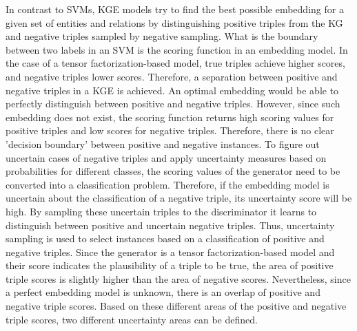 In contrast to \acp{SVM}, \ac{KGE} models try to find the best possible embedding for a given set of entities and relations by distinguishing positive triples from the \ac{KG} and negative triples sampled by negative sampling.
What is the boundary between two labels in an \ac{SVM} is the scoring function in an embedding model.
In the case of a tensor factorization-based model, true triples achieve higher scores, and negative triples lower scores.
Therefore, a separation between positive and negative triples in a \ac{KGE} is achieved.
An optimal embedding would be able to perfectly distinguish between positive and negative triples.
However, since such embedding does not exist, the scoring function returns high scoring values for positive triples and low scores for negative triples.
Therefore, there is no clear 'decision boundary' between positive and negative instances.
To figure out uncertain cases of negative triples and apply uncertainty measures based on probabilities for different classes, the scoring values of the generator need to be converted into a classification problem.
Therefore, if the embedding model is uncertain about the classification of a negative triple, its uncertainty score will be high.
By sampling these uncertain triples to the discriminator it learns to distinguish between positive and uncertain negative triples.
Thus, uncertainty sampling is used to select instances based on a classification of positive and negative triples.
Since the generator is a tensor factorization-based model and their score indicates the plausibility of a triple to be true, the area of positive triple scores is slightly higher than the area of negative scores.
Nevertheless, since a perfect embedding model is unknown, there is an overlap of positive and negative triple scores.
Based on these different areas of the positive and negative triple scores, two different uncertainty areas can be defined.

